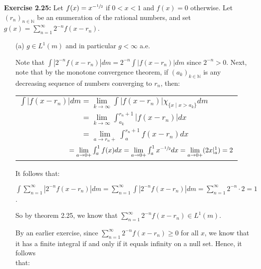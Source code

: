 \documentclass{book}
\newcommand{\exTwoP}{%
   \color{RedViolet}%
   \fontsize{13}{15}\selectfont%
}
\newenvironment{myIndent}{%
   \begin{adjustwidth}{2.5em}{0em}%
}{%
   \end{adjustwidth}%
}
\newcommand{\blab}[1]{\textbf{#1}}
\newcommand{\retTwo}{\hfill\bigbreak}
\begin{document}
\newpage

\blab{Exercise 2.25:} Let $f(x) = x^{-\sfrac{1}{2}}$ if $0 < x < 1$ and $f(x) = 0$ otherwise. Let $(r_n)_{n \in \mathbb{N}}$ be an enumeration of the rational numbers, and set $g(x) = \sum\limits_{n = 1}^\infty 2^{-n}f(x - r_n)$. \\ [-14pt]
\begin{enumerate}
   \item[(a)] $g \in L^1(m)$ and in particular $g < \infty$ a.e.
   
   \begin{myIndent}\exTwoP
      Note that $\int |2^{-n}f(x - r_n)|dm = 2^{-n}\int |f(x - r_n)|dm$ since $2^{-n} > 0$. Next, note that by the monotone convergence theorem, if $(a_k)_{k \in \mathbb{N}}$ is any decreasing sequence of numbers converging to $r_n$, then:

      {\centering 
      \begin{tabular}{l}
         $\int |f(x - r_n)|dm = \lim\limits_{k \rightarrow \infty}\int |f(x - r_n)|\chi_{\{x \mid x > a_k\}}dm$\\
         
         $\phantom{\int |f(x - r_n)|dm} = \lim\limits_{k \rightarrow \infty}\int_{a_k}^{r_n + 1}|f(x - r_n)|dx$\\

         $\phantom{\int |f(x - r_n)|dm} = \lim\limits_{a \rightarrow r_n+}\int_{a}^{r_n + 1}f(x - r_n)dx$\\

         $\phantom{\int |f(x - r_n)|dm} = \lim\limits_{a \rightarrow 0+}\int_{a}^{1}f(x)dx = \lim\limits_{a \rightarrow 0+}\int_{a}^{1}x^{-\sfrac{1}{2}}dx = \lim\limits_{a \rightarrow 0+} (2x|_a^1) = 2$\\
      \end{tabular} \retTwo\par}

      It follows that:
      
      {\centering $\int \sum\limits_{n = 1}^\infty |2^{-n}f(x - r_n)|dm = \sum\limits_{n = 1}^\infty \int |2^{-n}f(x - r_n)|dm = \sum\limits_{n = 1}^\infty 2^{-n} \cdot 2 = 1$.\retTwo\par}

      So by theorem 2.25, we know that $\sum\limits_{n = 1}^\infty 2^{-n} f(x - r_n) \in L^1(m)$.\retTwo

      By an earlier exercise, since $\sum\limits_{n = 1}^\infty 2^{-n} f(x - r_n) \geq 0$ for all $x$, we know that it has a finite integral if and only if it equals infinity on a null set. Hence, it follows\\ [5pt] that:


\end{myIndent}
\end{enumerate}
\end{document}

